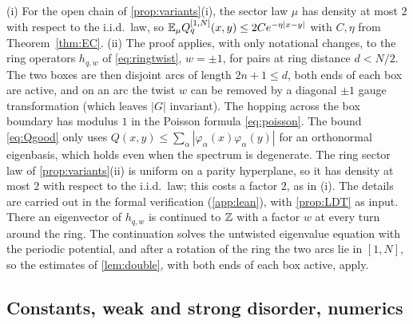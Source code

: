 \begin{remark}\label{rem:ringEC}
(i) For the open chain of \cref{prop:variants}(i), the sector law $\mu$ has density at most $2$ with respect
to the i.i.d.\ law, so $\mathbb{E}_\mu Q^{[1,N]}_q(x,y)\le2Ce^{-\eta|x-y|}$ with $C,\eta$ from Theorem~\ref{thm:EC}.
(ii) The proof applies, with only notational changes, to the ring operators $h_{q,w}$ of
\eqref{eq:ringtwist}, $w=\pm1$, for pairs at ring distance $d<N/2$.  The two boxes are then disjoint arcs
of length $2n+1\le d$, both ends of each box are active, and on an arc the twist $w$ can be removed by a
diagonal $\pm1$ gauge transformation (which leaves $|G|$ invariant).  The hopping across the box boundary
has modulus $1$ in the Poisson formula \eqref{eq:poisson}.  The bound \eqref{eq:Qgood} only uses
$Q(x,y)\le\sum_\alpha|\varphi_\alpha(x)\varphi_\alpha(y)|$ for an orthonormal eigenbasis, which holds even when the
spectrum is degenerate.  The ring sector law of \cref{prop:variants}(ii) is uniform on a parity hyperplane,
so it has density at most $2$ with respect to the i.i.d.\ law; this costs a factor $2$, as in (i).  The details
are carried out in the formal verification (\cref{app:lean}), with \cref{prop:LDT} as input.  There an eigenvector of
$h_{q,w}$ is continued to $\mathbb{Z}$ with a factor $w$ at every turn around the ring.  The continuation solves the
untwisted eigenvalue equation with the periodic potential, and after a rotation of the ring the two arcs lie in
$[1,N]$, so the estimates of \cref{lem:double}, with both ends of each box active, apply.
\end{remark}

\subsection{Constants, weak and strong disorder, numerics}\label{sec:onebody:remarks}

